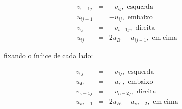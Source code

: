 \documentclass[poisson.tex]{subfiles}
\begin{document}
\begin{eqnarray}
v_{i-1j} &=& -v_{ij},\,\, \textrm{esquerda}\\
u_{ij-1}&=&-u_{ij},\,\, \textrm{embaixo} \\
v_{ij} &=& -v_{i-1j},\,\, \textrm{direita}\\
u_{ij} &=& 2u_{Bi}-u_{ij-1},\,\, \textrm{em cima}
\end{eqnarray}

fixando o índice de cada lado:

\begin{eqnarray}
v_{0j} &=& -v_{1j},\,\, \textrm{esquerda}\\
u_{i0}&=&-u_{i1},\,\, \textrm{embaixo} \\
v_{n-1j} &=& -v_{n-2j},\,\, \textrm{direita}\\
u_{in-1} &=& 2u_{Bi}-u_{in-2},\,\, \textrm{em cima}
\end{eqnarray}
\end{document}
